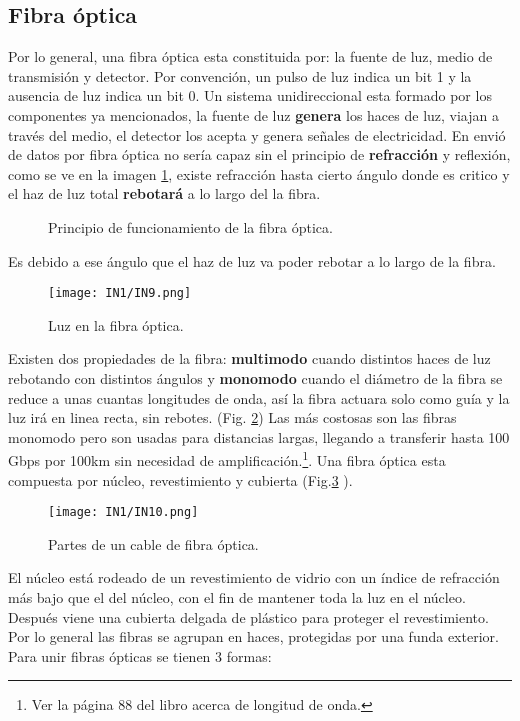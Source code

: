\documentclass[
	12pt, %
	fleqn, %
	a4paper, %
]{LegrandOrangeBook}
\begin{document}
\subsection{Fibra óptica}
Por lo general, una fibra óptica esta constituida por: la fuente de luz, medio de transmisión y detector. Por convención, un pulso de luz indica un bit 1 y la ausencia de luz indica un bit 0. Un sistema unidireccional esta formado por los componentes ya mencionados, la fuente de luz \textbf{genera} los haces de luz, viajan a través del medio, el detector los acepta y genera señales  de electricidad. En envió de datos por fibra óptica no sería capaz sin el principio de \textbf{refracción} y reflexión, como se ve en la imagen \ref{fig:fibra optica funcionamiento}, existe refracción hasta cierto ángulo donde es critico y el haz de luz total \textbf{rebotará} a lo largo del la fibra.
\begin{figure}[H]
\centering
{}
\caption{Principio de funcionamiento de la fibra óptica.}
\label{fig:fibra optica funcionamiento}
\end{figure}
Es debido a ese ángulo que el haz de luz va poder rebotar a lo largo de la fibra. \begin{figure}[]
\centering
\texttt{[image: IN1/IN9.png]}
\caption{Luz en la fibra óptica.}
\label{fig:modos en la fibra}
\end{figure}
Existen dos propiedades de la fibra: \textbf{multimodo} cuando distintos haces de luz rebotando con distintos ángulos y \textbf{monomodo} cuando el diámetro de la fibra se reduce a unas cuantas longitudes de onda, así la fibra actuara solo como guía y la luz irá en linea recta, sin rebotes. (Fig. \ref{fig:modos en la fibra}) Las más costosas son las fibras monomodo pero son usadas para distancias largas, llegando a transferir hasta 100 Gbps por 100km sin necesidad de amplificación.\footnote{Ver la página 88 del libro \cite{tanenbaum2012computer} acerca de longitud de onda.}. Una fibra óptica esta compuesta por núcleo, revestimiento y cubierta (Fig.\ref{fig:partes fibra} ).
\begin{figure}[]
\centering
\texttt{[image: IN1/IN10.png]}
\caption{Partes de un cable de fibra óptica.}
\label{fig:partes fibra}
\end{figure}
El núcleo está rodeado de un revestimiento de vidrio con un índice de refracción más bajo que el del núcleo, con el fin de mantener toda la luz en el núcleo. Después viene una cubierta delgada de plástico para proteger el revestimiento. Por lo general las fibras se agrupan en haces, protegidas por una funda exterior. Para unir fibras ópticas se tienen 3 formas:
\end{document}
